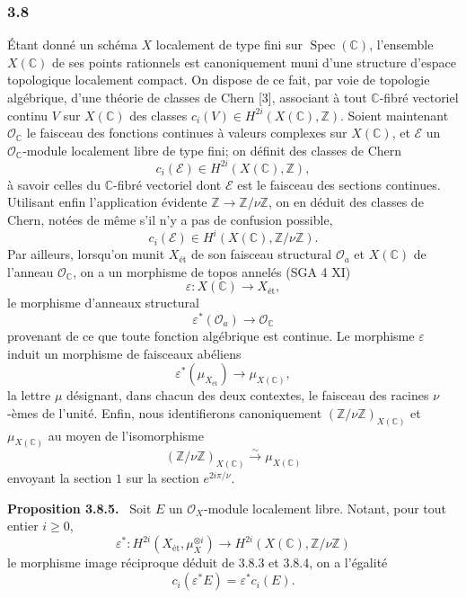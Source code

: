 \documentclass[11pt]{article}
\newenvironment{statement}[1]{\par\medskip\noindent\textbf{#1.}\ }{\par\medskip}
\begin{document}
\subsubsection*{3.8}
Étant donné un schéma $X$ localement de type fini sur $\operatorname{Spec}(\mathbb C)$, l'ensemble $X(\mathbb C)$ de ses points rationnels est canoniquement muni d'une structure d'espace topologique localement compact. On dispose de ce fait, par voie de topologie algébrique, d'une théorie de classes de Chern [3], associant à tout $\mathbb C$-fibré vectoriel continu $V$ sur $X(\mathbb C)$ des classes $c_i(V)\in H^{2i}(X(\mathbb C),\mathbb Z)$. Soient maintenant $\mathcal O_\mathbb C$ le faisceau des fonctions continues à valeurs complexes sur $X(\mathbb C)$, et $\mathcal E$ un $\mathcal O_\mathbb C$-module localement libre de type fini; on définit des classes de Chern
\[
c_i(\mathcal E)\in H^{2i}(X(\mathbb C),\mathbb Z),
\]
à savoir celles du $\mathbb C$-fibré vectoriel dont $\mathcal E$ est le faisceau des sections continues. Utilisant enfin l'application évidente $\mathbb Z\to\mathbb Z/\nu\mathbb Z$, on en déduit des classes de Chern, notées de même s'il n'y a pas de confusion possible,
\[
c_i(\mathcal E)\in H^i(X(\mathbb C),\mathbb Z/\nu\mathbb Z).
\tag{3.8.1}
\]
Par ailleurs, lorsqu'on munit $X_{\mathrm{ét}}$ de son faisceau structural $\mathcal O_a$ et $X(\mathbb C)$ de l'anneau $\mathcal O_\mathbb C$, on a un morphisme de topos annelés (SGA 4 XI)
\[
\varepsilon:X(\mathbb C)\to X_{\mathrm{ét}},
\]
le morphisme d'anneaux structural
\[
\varepsilon^*(\mathcal O_a)\to\mathcal O_\mathbb C
\tag{3.8.2}
\]
provenant de ce que toute fonction algébrique est continue. Le morphisme $\varepsilon$ induit un morphisme de faisceaux abéliens
\[
\varepsilon^*(\mu_{X_{\mathrm{ét}}})\to \mu_{X(\mathbb C)},
\tag{3.8.3}
\]
la lettre $\mu$ désignant, dans chacun des deux contextes, le faisceau des racines $\nu$-èmes de l'unité. Enfin, nous identifierons canoniquement $(\mathbb Z/\nu\mathbb Z)_{X(\mathbb C)}$ et $\mu_{X(\mathbb C)}$ au moyen de l'isomorphisme
\[
(\mathbb Z/\nu\mathbb Z)_{X(\mathbb C)}
 \xrightarrow{\sim}\mu_{X(\mathbb C)}
\tag{3.8.4}
\]
envoyant la section $1$ sur la section $e^{2i\pi/\nu}$.

\begin{statement}{Proposition 3.8.5}
Soit $E$ un $\mathcal O_X$-module localement libre. Notant, pour tout entier $i\ge0$,
\[
\varepsilon^*:H^{2i}(X_{\mathrm{ét}},\mu_X^{\otimes i})
\to H^{2i}(X(\mathbb C),\mathbb Z/\nu\mathbb Z)
\]
le morphisme image réciproque déduit de 3.8.3 et 3.8.4, on a l'égalité
\[
c_i(\varepsilon^*E)=\varepsilon^*c_i(E).
\]
\end{statement}
\end{document}
